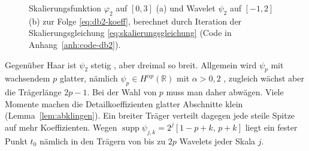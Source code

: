 \documentclass[a4paper,11pt,bibliography=totoc,listof=totoc,headinclude=true,cleardoublepage=empty,oneside]{scrbook}
\theoremstyle{plain}
\theoremstyle{definition}
\newcommand{\R}{\mathbb{R}}
\DeclareMathOperator{\supp}{supp}
\begin{document}
\begin{figure}[htbp]
  \centering
  \hfill
  \caption[Das Daubechies-Wavelet mit vier Koeffizienten]{Skalierungsfunktion
  $\varphi_2$ auf $[0,3]$ (a) und Wavelet $\psi_2$ auf $[-1,2]$ (b) zur Folge
  \eqref{eq:db2-koeff}, berechnet durch Iteration der
  Skalierungsgleichung \eqref{eq:skalierungsgleichung}
  (Code in Anhang~\ref{anh:code-db2}).}
  \label{fig:db2}
\end{figure}

Gegenüber Haar ist $\psi_2$ stetig \cite[Satz~(6.11)]{blatter}, %
aber dreimal so breit. Allgemein wird $\psi_p$ mit wachsendem $p$ glatter,
nämlich $\psi_p \in H^{\alpha p}(\R)$ mit $\alpha > 0{,}2$
\cite[Kap.~2.4.4]{lmr}, %
zugleich wächst aber die Trägerlänge $2p-1$.
Bei der Wahl von $p$ muss man daher abwägen. Viele Momente machen die
Detailkoeffizienten glatter Abschnitte klein (Lemma~\ref{lem:abklingen}). Ein
breiter Träger verteilt dagegen jede steile Spitze auf mehr Koeffizienten.
Wegen $\supp\psi_{j,k} = 2^j[1-p+k,\,p+k]$ liegt ein fester Punkt $t_0$ nämlich
in den Trägern von bis zu $2p$ Wavelets jeder Skala $j$.
\end{document}
